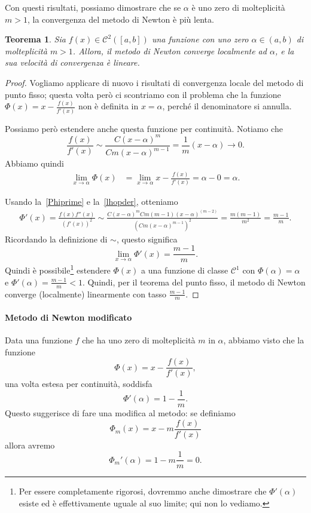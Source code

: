 \documentclass[a4paper]{report}
\newtheorem{theorem}{Teorema}[chapter]
\theoremstyle{definiton}
\theoremstyle{remark}
\begin{document}
Con questi risultati, possiamo dimostrare che se $\alpha$ è uno zero di molteplicità $m>1$, la convergenza del metodo di Newton è più lenta.
\begin{theorem}
    Sia $f(x) \in \mathcal{C}^2([a,b])$ una funzione con uno zero $\alpha \in (a,b)$ di molteplicità $m>1$.
    Allora, il metodo di Newton converge localmente ad $\alpha$, e la sua velocità di convergenza è lineare.
\end{theorem}
\begin{proof}
Vogliamo applicare di nuovo i risultati di convergenza locale del metodo di punto fisso; questa volta però ci scontriamo con il problema che la funzione $\Phi(x) = x - \frac{f(x)}{f'(x)}$ non è definita in $x=\alpha$, perché il denominatore si annulla.

Possiamo però estendere anche questa funzione per continuità. Notiamo che
\[
    \frac{f(x)}{f'(x)} \sim \frac{C(x-\alpha)^m}{Cm(x-\alpha)^{m-1}} = \frac{1}{m}(x-\alpha) \to 0.
\]
Abbiamo quindi
\begin{align*}
    \lim_{x\to\alpha} \Phi(x) &= \lim_{x\to\alpha} x - \frac{f(x)}{f'(x)} = \alpha - 0 = \alpha.
\end{align*}

Usando la~\eqref{Phiprime} e la~\eqref{lhopder}, otteniamo
\begin{align*}
    \Phi'(x) = \frac{f(x)f''(x)}{(f'(x))^2} \sim \frac{C(x-\alpha)^m Cm(m-1)(x-\alpha)^{(m-2)}}{(Cm(x-\alpha)^{m-1})^2} = 
    \frac{m(m-1)}{m^2} = \frac{m-1}{m}.
\end{align*}
Ricordando la definizione di $\sim$, questo significa
\[
    \lim_{x\to\alpha} \Phi'(x) = \frac{m-1}{m}.
\]
Quindi è possibile\footnote{Per essere completamente rigorosi, dovremmo anche dimostrare che $\Phi'(\alpha)$ esiste ed è effettivamente uguale al suo limite; qui non lo vediamo.} estendere $\Phi(x)$ a una funzione di classe $\mathcal{C}^1$ con $\Phi(\alpha)=\alpha$ e $\Phi'(\alpha) = \frac{m-1}{m} < 1$. Quindi, per il teorema del punto fisso, il metodo di Newton converge (localmente) linearmente con tasso $\frac{m-1}{m}$.
\end{proof}

\paragraph{Metodo di Newton modificato} Data una funzione $f$ che ha uno zero di molteplicità $m$ in $\alpha$, abbiamo visto che la funzione
\[
    \Phi(x) = x - \frac{f(x)}{f'(x)},
\]
una volta estesa per continuità, soddisfa
\[
    \Phi'(\alpha) = 1 - \frac{1}{m}.
\]
Questo suggerisce di fare una modifica al metodo: se definiamo
\[
    \Phi_m(x) = x - m \frac{f(x)}{f'(x)}
\]
allora avremo
\[
    \Phi_m'(\alpha) = 1 - m\frac{1}{m} = 0.
\]
\end{document}
